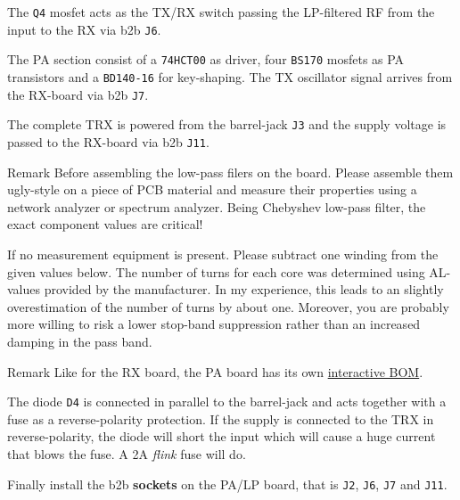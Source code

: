 \documentclass[10pt, a4paper,twoside]{scrartcl}
\newenvironment{remark}{\begin{bclogo}[couleur=blue!30,arrondi=.1,logo=\bcinfo,ombre=true]{Remark}}{\end{bclogo}}
\begin{document}
The \texttt{Q4} mosfet acts as the TX/RX switch passing the LP-filtered RF from the input to the RX via b2b \texttt{J6}.

The PA section consist of a \texttt{74HCT00} as driver, four \texttt{BS170} mosfets as PA transistors and a \texttt{BD140-16} for key-shaping. The TX oscillator signal arrives from the RX-board via b2b \texttt{J7}.

The complete TRX is powered from the barrel-jack \texttt{J3} and the supply voltage is passed to the RX-board via b2b \texttt{J11}. 

\begin{remark}
 Before assembling the low-pass filers on the board. Please assemble them ugly-style on a piece of PCB material and measure their properties using a network analyzer or spectrum analyzer. Being Chebyshev low-pass filter, the exact component values are critical!
\end{remark}

 If no measurement equipment is present. Please subtract one winding from the given values below. The number of turns for each core was determined using AL-values provided by the manufacturer. In my experience, this leads to an slightly overestimation of the number of turns by about one. Moreover, you are probably more willing to risk a lower stop-band suppression rather than an increased damping in the pass band.

\begin{remark}
 Like for the RX board, the PA board has its own \href{https://dm3mat.darc.de/cw2019/pa_rev2_ibom.html}{interactive BOM}.
\end{remark}

 The diode \texttt{D4} is connected in parallel to the barrel-jack and acts together with a fuse as a reverse-polarity protection. If the supply is connected to the TRX in reverse-polarity, the diode will short the input which will cause a huge current that blows the fuse. A 2A \emph{flink} fuse will do.
 
 Finally install the b2b \textbf{sockets} on the PA/LP board, that is \texttt{J2}, \texttt{J6}, \texttt{J7} and \texttt{J11}.
 
\clearpage
\end{document}
